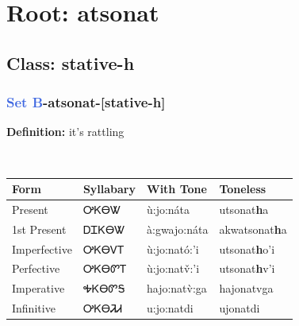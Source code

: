 \needspace{4in}
\section*{Root: atsonat}
\nopagebreak
{}
\needspace{3in}
\subsection*{Class: stative-h}
\nopagebreak
\needspace{2in}
\subsubsection*{\textcolor{RoyalBlue}{Set B}{-}\textbf{atsonat}{-}[stative-h]}
\nopagebreak
\textbf{Definition: } it{\textquoteright}s rattling
\\[0.5em]
\begin{tabularx}{\textwidth}{l X X X}%
\toprule%
\textbf{Form}&\textbf{Syllabary}&\textbf{With Tone}&\textbf{Toneless}\\%
\midrule%
Present&ᎤᏦᎾᏔ&ù:jo:náta&utsonat\textbf{h}a\\%
1st Present&ᎠᏆᏦᎾᏔ&à:gwajo:náta&akwatsonat\textbf{h}a\\%
Imperfective&ᎤᏦᎾᏙᎢ&ù:jo:nató:’i&utsonat\textbf{h}o'i\\%
Perfective&ᎤᏦᎾᏛᎢ&ù:jo:natv̌:’i&utsonat\textbf{h}v'i\\%
Imperative&ᎭᏦᎾᏛᎦ&hajo:natv̀:ga&hajonatvga\\%
Infinitive&ᎤᏦᎾᏘᏗ&u:jo:natdi&ujonatdi\\%
\bottomrule%
\end{tabularx}
\\[1em]